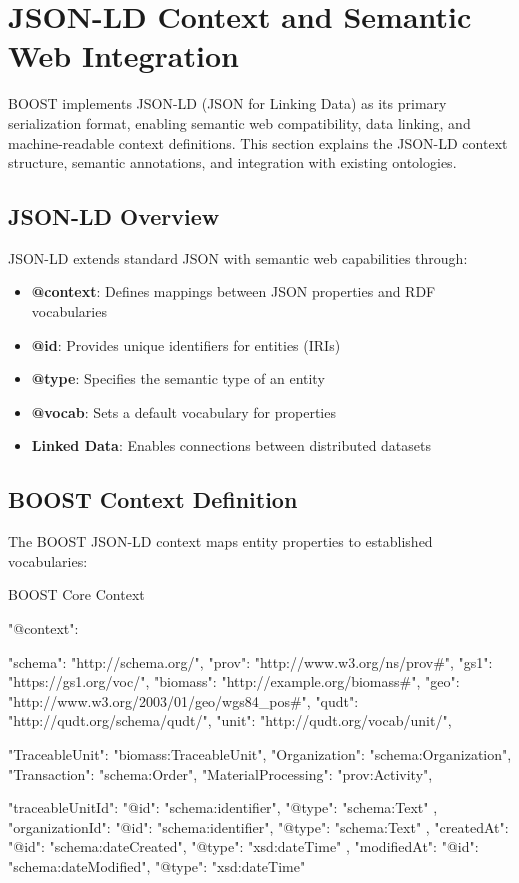 
\section{JSON-LD Context and Semantic Web Integration}
\label{sec:jsonld-context}

BOOST implements JSON-LD (JSON for Linking Data) as its primary serialization format, enabling semantic web compatibility, data linking, and machine-readable context definitions. This section explains the JSON-LD context structure, semantic annotations, and integration with existing ontologies.

\subsection{JSON-LD Overview}
\label{sec:jsonld-overview}

JSON-LD extends standard JSON with semantic web capabilities through:

\begin{itemize}
    \item \textbf{@context}: Defines mappings between JSON properties and RDF vocabularies
    \item \textbf{@id}: Provides unique identifiers for entities (IRIs)
    \item \textbf{@type}: Specifies the semantic type of an entity
    \item \textbf{@vocab}: Sets a default vocabulary for properties
    \item \textbf{Linked Data}: Enables connections between distributed datasets
\end{itemize}

\subsection{BOOST Context Definition}
\label{sec:boost-context}

The BOOST JSON-LD context maps entity properties to established vocabularies:

\begin{jsonexample}{BOOST Core Context}
{
  "@context": {
    "schema": "http://schema.org/",
    "prov": "http://www.w3.org/ns/prov#",
    "gs1": "https://gs1.org/voc/",
    "biomass": "http://example.org/biomass#",
    "geo": "http://www.w3.org/2003/01/geo/wgs84_pos#",
    "qudt": "http://qudt.org/schema/qudt/",
    "unit": "http://qudt.org/vocab/unit/",
    
    "TraceableUnit": "biomass:TraceableUnit",
    "Organization": "schema:Organization",
    "Transaction": "schema:Order",
    "MaterialProcessing": "prov:Activity",
    
    "traceableUnitId": {
      "@id": "schema:identifier",
      "@type": "schema:Text"
    },
    "organizationId": {
      "@id": "schema:identifier",
      "@type": "schema:Text"
    },
    "createdAt": {
      "@id": "schema:dateCreated",
      "@type": "xsd:dateTime"
    },
    "modifiedAt": {
      "@id": "schema:dateModified",
      "@type": "xsd:dateTime"
    }
  }
}
\end{jsonexample}


